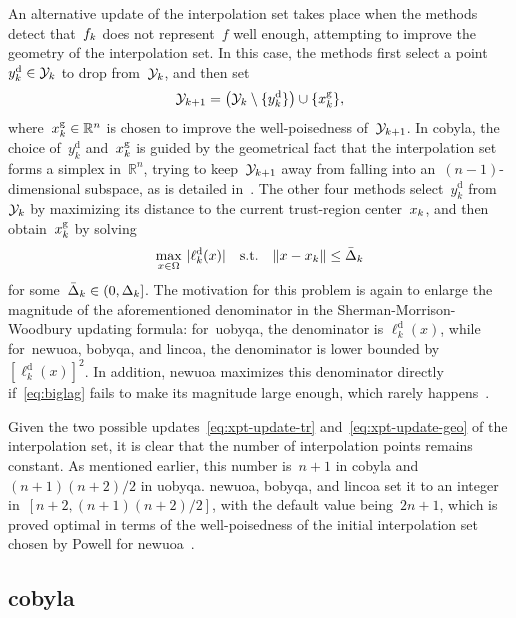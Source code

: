 \documentclass[manuscript,screen,review]{acmart}
\numberwithin{equation}{section}
\newcommand*{\R}{\mathbb{R}}
\newcommand*{\abs}[2][]{#1\lvert#2#1\rvert}
\newcommand*{\drop}{{\text{d}}}
\newcommand*{\fset}{\Omega}
\newcommand*{\geo}{{\text{g}}}
\newcommand*{\iter}[1][k]{x\ifthenelse{\equal{#1}{}}{}{_{#1}}}
\newcommand*{\norm}[2][]{#1\lVert#2#1\rVert}
\newcommand*{\objm}[1][k]{\obj\ifthenelse{\equal{#1}{}}{}{_{#1}}}
\newcommand*{\obj}{f}
\newcommand*{\radalt}[1][k]{\bar{\Delta}\ifthenelse{\equal{#1}{}}{}{_{#1}}}
\newcommand*{\rad}[1][k]{\Delta\ifthenelse{\equal{#1}{}}{}{_{#1}}}
\newcommand*{\set}[2][]{#1\{#2#1\}}
\newcommand*{\st}{\text{s.t.}}
\newcommand*{\xpt}[1][k]{\mathcal{Y}\ifthenelse{\equal{#1}{}}{}{_{#1}}}
\begin{document}
An alternative update of the interpolation set takes place when the methods detect that~$\objm$ does not represent~$\obj$ well enough, attempting to improve the geometry of the interpolation set.
In this case, the methods first select a point~$y_k^{\drop} \in \xpt$ to drop from~$\xpt$, and then set
\begin{equation}
    \label{eq:xpt-update-geo}
    \xpt[k + 1] = \big(\xpt \setminus \set{y_k^{\drop}}\big) \cup \set{\iter^{\geo}},
\end{equation}
where~$\iter^{\geo} \in \R^n$ is chosen to improve the well-poisedness of~$\xpt[k + 1]$.
In \gls{cobyla}, the choice of~$y_k^{\drop}$ and~$\iter^{\geo}$ is guided by the geometrical fact that the interpolation set forms a simplex in~$\R^n$, trying to keep~$\xpt[k + 1]$ away from falling into an~$(n - 1)$-dimensional subspace, as is detailed in~\mbox{\cite[equations~(15)--(17)]{Powell_1994}}.
The other four methods select~$y_k^{\drop}$ from~$\xpt$ by maximizing its distance to the current trust-region center~$\iter$, and then obtain~$\iter^{\geo}$ by solving
\begin{equation}
    \label{eq:biglag}
        \max_{x \in \fset} ~ \abs{\ell_k^{\drop}(x)} \quad \st \quad  \norm{x - \iter} \le \radalt
\end{equation}
for some~$\radalt \in (0, \rad]$.
The motivation for this problem is again to enlarge the magnitude of the aforementioned denominator in the Sherman-Morrison-Woodbury updating formula: for~\gls{uobyqa}, the denominator is $\ell_k^{\drop}(x)$, while for~\gls{newuoa}, \gls{bobyqa}, and \gls{lincoa}, the denominator is lower bounded by $[\ell_k^{\drop}(x)]^2$.
In addition, \gls{newuoa} maximizes this denominator directly if~\eqref{eq:biglag} fails to make its magnitude large enough, which rarely happens~\cite[\S~6]{Powell_2006}.

Given the two possible updates~\eqref{eq:xpt-update-tr} and~\eqref{eq:xpt-update-geo} of the interpolation set, it is clear that the number of interpolation points remains constant.
As mentioned earlier, this number is~$n + 1$ in \gls{cobyla} and~$(n + 1) (n + 2) / 2$ in \gls{uobyqa}.
\Gls{newuoa}, \gls{bobyqa}, and \gls{lincoa} set it to an integer in~$[n+2, (n + 1) (n + 2) / 2]$, with the default value being~$2n + 1$, which is proved optimal in terms of the well-poisedness of the initial interpolation set chosen by Powell for \gls{newuoa}~\cite{Ragonneau_Zhang_2023a}.

\subsection{\gls{cobyla}}
\label{subsec:cobyla}
\end{document}
